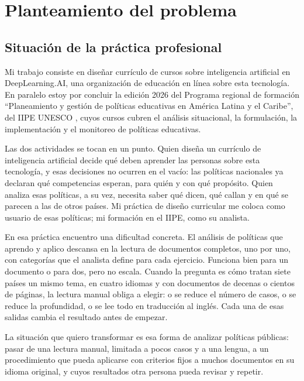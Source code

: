 
\providecommand{\pendiente}[1]{\textbf{[Pendiente: #1]}}

\chapter{Planteamiento del problema}
\label{cap:planteamiento}

\section{Situación de la práctica profesional}
\label{sec:practica}

Mi trabajo consiste en diseñar currículo de cursos sobre inteligencia artificial en
DeepLearning.AI, una organización de educación en línea sobre esta tecnología. En paralelo
estoy por concluir la edición 2026 del Programa regional de formación ``Planeamiento y
gestión de políticas educativas en América Latina y el Caribe'', del IIPE UNESCO
\citep{iipe2026prf}, cuyos cursos cubren el análisis situacional, la formulación, la
implementación y el monitoreo de políticas educativas.

Las dos actividades se tocan en un punto. Quien diseña un currículo de inteligencia
artificial decide qué deben aprender las personas sobre esta tecnología, y esas decisiones
no ocurren en el vacío: las políticas nacionales ya declaran qué competencias esperan, para
quién y con qué propósito. Quien analiza esas políticas, a su vez, necesita saber qué dicen,
qué callan y en qué se parecen a las de otros países. Mi práctica de diseño curricular me
coloca como usuario de esas políticas; mi formación en el IIPE, como su analista.

En esa práctica encuentro una dificultad concreta. El análisis de políticas que aprendo y
aplico descansa en la lectura de documentos completos, uno por uno, con categorías que el
analista define para cada ejercicio. Funciona bien para un documento o para dos, pero no
escala. Cuando la pregunta es cómo tratan siete países un mismo tema, en cuatro idiomas y
con documentos de decenas o cientos de páginas, la lectura manual obliga a elegir: o se
reduce el número de casos, o se reduce la profundidad, o se lee todo en traducción al
inglés. Cada una de esas salidas cambia el resultado antes de empezar.

La situación que quiero transformar es esa forma de analizar políticas públicas: pasar de
una lectura manual, limitada a pocos casos y a una lengua, a un procedimiento que pueda
aplicarse con criterios fijos a muchos documentos en su idioma original, y cuyos resultados
otra persona pueda revisar y repetir.

